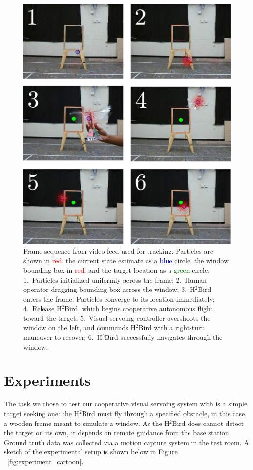 \documentclass{aamas2013}
\begin{document}
\begin{figure}[tb]
\centering
\includegraphics[width=\linewidth]{figures/pf_screencap.pdf}
\caption{Frame sequence from video feed used for tracking. Particles 
are shown in \textcolor{red}{red}, the current state estimate as a 
\textcolor{blue}{blue} circle, the window bounding box in
\textcolor{red}{red}, and the target location as a \textcolor{green}{green} 
circle. 1.~Particles initialized uniformly across the frame; 2.~Human operator 
dragging bounding box across the window; 3.~H$^2$Bird enters the frame. 
Particles converge to its location immediately; 4.~Release H$^2$Bird, which 
begins cooperative autonomous flight toward the target; 5.~Visual servoing 
controller overshoots the window on the left, and commands H$^2$Bird with a 
right-turn maneuver to recover; 6.~H$^2$Bird successfully navigates through 
the window.}
\label{fig:pf_screencap}
\end{figure}


\section{Experiments}
The task we chose to test our cooperative visual servoing system with is a 
simple target seeking one: the H$^2$Bird must fly through a specified obstacle,
in this case, a wooden frame meant to simulate a window. As the H$^2$Bird does
cannot detect the target on its own, it depends on remote guidance from the
base station. Ground truth data was collected via a motion capture system in
the test room. A sketch of the experimental setup is shown below in Figure 
~\ref{fig:experiment_cartoon}.
\end{document}
